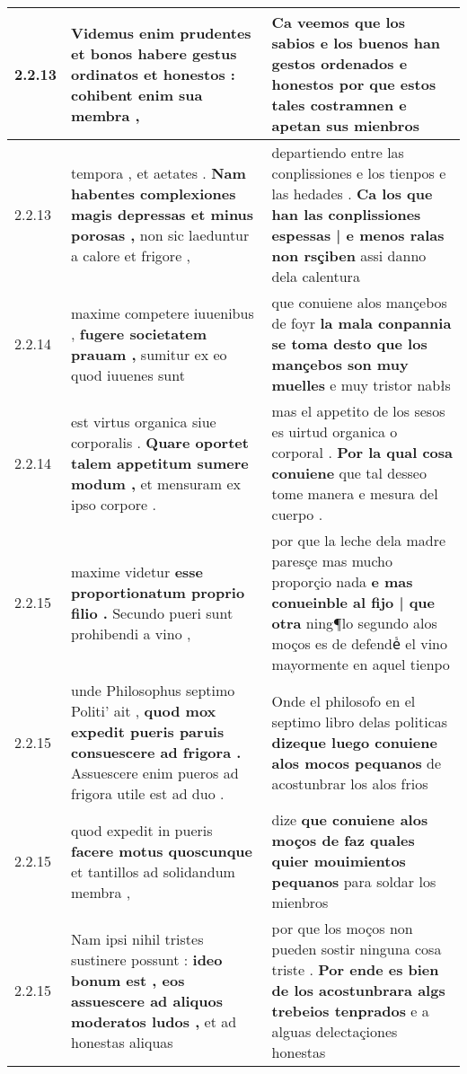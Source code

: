 \begin{tabular}{|p{1cm}|p{6.5cm}|p{6.5cm}|}
2.2.13 & Videmus enim prudentes et bonos habere \textbf{ gestus ordinatos et honestos : } cohibent enim sua membra , & Ca veemos que los sabios \textbf{ e los buenos han gestos ordenados e honestos } por que estos tales costramnen e apetan sus mienbros \\\hline
2.2.13 & tempora , et aetates . \textbf{ Nam habentes complexiones magis depressas et minus porosas , } non sic laeduntur a calore et frigore , & departiendo entre las conplissiones e los tienpos e las hedades . \textbf{ Ca los que han las conplissiones espessas | e menos ralas non rsçiben } assi danno dela calentura \\\hline
2.2.14 & maxime competere iuuenibus , \textbf{ fugere societatem prauam , } sumitur ex eo quod iuuenes sunt & que conuiene alos mançebos de foyr \textbf{ la mala conpannia se toma desto que los mançebos son muy muelles } e muy tristor nabłs \\\hline
2.2.14 & est virtus organica siue corporalis . \textbf{ Quare oportet talem appetitum sumere modum , } et mensuram ex ipso corpore . & mas el appetito de los sesos es uirtud organica o corporal . \textbf{ Por la qual cosa conuiene } que tal desseo tome manera e mesura del cuerpo . \\\hline
2.2.15 & maxime videtur \textbf{ esse proportionatum proprio filio . } Secundo pueri sunt prohibendi a vino , & por que la leche dela madre paresçe mas mucho proporçio nada \textbf{ e mas conueinble al fijo | que otra } ning¶lo segundo alos moços es de defendeᷤ el vino mayormente en aquel tienpo \\\hline
2.2.15 & unde Philosophus septimo Politi’ ait , \textbf{ quod mox expedit pueris paruis consuescere ad frigora . } Assuescere enim pueros ad frigora utile est ad duo . & Onde el philosofo en el septimo libro delas politicas \textbf{ dizeque luego conuiene alos mocos pequanos } de acostunbrar los alos frios \\\hline
2.2.15 & quod expedit in pueris \textbf{ facere motus quoscunque } et tantillos ad solidandum membra , & dize \textbf{ que conuiene alos moços de faz quales quier mouimientos pequanos } para soldar los mienbros \\\hline
2.2.15 & Nam ipsi nihil tristes sustinere possunt : \textbf{ ideo bonum est , eos assuescere ad aliquos moderatos ludos , } et ad honestas aliquas & por que los moços non pueden sostir ninguna cosa triste . \textbf{ Por ende es bien de los acostunbrara algs trebeios tenprados } e a alguas delectaçiones honestas \\\hline

\end{tabular}
